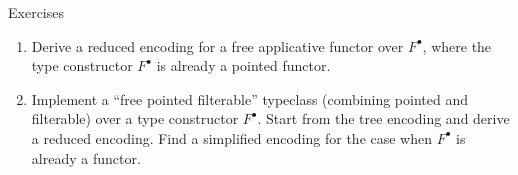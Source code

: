 \documentclass[english,,russian]{beamer}
\begin{document}
\begin{frame}{Exercises}
\begin{enumerate}
{show that $\exists Z.Z\cong1$ and that $\exists Z.Z\times A\cong A$.}{\footnotesize\par}
\item {\footnotesize{}Derive a reduced encoding for a free applicative functor
over $F^{\bullet}$, where the type constructor $F^{\bullet}$ is
already a pointed functor. }{\footnotesize\par}
\item {\footnotesize{}Implement a ``free pointed filterable'' typeclass
(combining pointed and filterable) over a type constructor $F^{\bullet}$.
Start from the tree encoding and derive a reduced encoding. Find a
simplified encoding for the case when $F^{\bullet}$ is already a
functor.}{\footnotesize\par}
\end{enumerate}
\end{frame}
\end{document}
